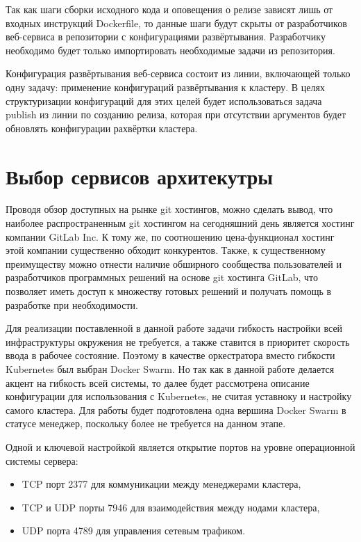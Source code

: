 Так как шаги сборки исходного кода и оповещения о релизе зависят лишь от входных инструкций Dockerfile, то данные шаги будут
скрыты от разработчиков веб-сервиса в репозитории с конфигурациями развёртывания.
Разработчику необходимо будет только импортировать необходимые задачи из репозитория.

Конфигурация развёртывания веб-сервиса состоит из линии, включающей только одну задачу: применение конфигураций развёртывания к кластеру.
В целях структуризации конфигураций для этих целей будет использоваться задача publish из линии по созданию релиза, которая при отсутствии аргументов будет обновлять конфигурации рахвёртки кластера.

\section{Выбор сервисов архитекутры}

Проводя обзор доступных на рынке git хостингов, можно сделать вывод, что наиболее распространенным git хостингом на сегодняшний день является хостинг компании GitLab Inc.
К тому же, по соотношению цена-функционал хостинг этой компании существенно обходит конкурентов.
Также, к существенному преимуществу можно отнести наличие обширного сообщества пользователей и разработчиков программных решений на основе git хостинга GitLab,
что позволяет иметь доступ к множеству готовых решений и получать помощь в разработке при необходимости.

Для реализации поставленной в данной работе задачи гибкость настройки всей инфраструктуры окружения не требуется, а также ставится в приоритет скорость ввода в рабочее состояние.
Поэтому в качестве оркестратора вместо гибкости Kubernetes был выбран Docker Swarm\cite{devOpsPhy}.
Но так как в данной работе делается акцент на гибкость всей системы, то далее будет рассмотрена описание конфигурации для использования с Kubernetes, не считая уставноку и настройку самого кластера.
Для работы будет подготовлена одна вершина Docker Swarm в статусе менеджер, поскольку более не требуется на данном этапе.

Одной и ключевой настройкой является открытие портов на уровне операционной системы сервера\cite{web:docker:swarm}:

\begin{itemize}
    \item TCP порт 2377 для коммуникации между менеджерами кластера,
    \item TCP и UDP порты 7946 для взаимодействия между нодами кластера,
    \item UDP порта 4789 для управления сетевым трафиком.
\end{itemize}

